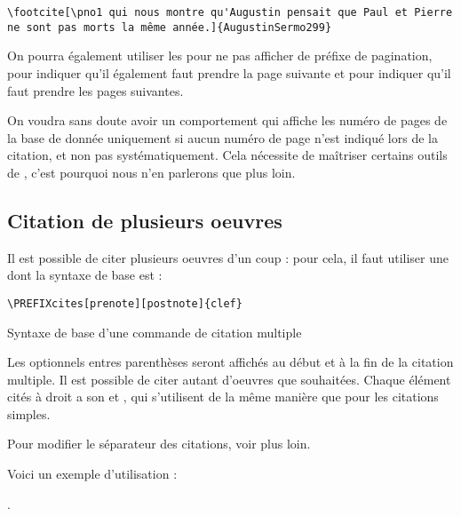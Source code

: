 \begin{verbatim}
\footcite[\pno1 qui nous montre qu'Augustin pensait que Paul et Pierre ne sont pas morts la même année.]{AugustinSermo299}
\end{verbatim}

On pourra également utiliser les   pour ne pas afficher de préfixe de pagination,   pour indiquer qu'il également faut prendre la page suivante et  pour indiquer qu'il faut prendre les pages suivantes.

\begin{anedocte}
On voudra sans doute avoir un comportement qui affiche les numéro de pages de la base de donnée uniquement si aucun numéro de page n'est indiqué lors de la citation, et non pas systématiquement. Cela nécessite de maîtriser certains outils de , c'est pourquoi nous n'en parlerons que plus loin.
\end{anedocte}

\subsection{Citation de plusieurs oeuvres}

Il est possible de citer plusieurs oeuvres d'un coup : pour cela, il faut utiliser une  dont la syntaxe de base est :

\begin{listing}[ht]
\begin{verbatim}
\PREFIXcites[prenote][postnote]{clef}
\end{verbatim}
\caption{Syntaxe de base d'une commande de citation multiple}
\end{listing}
Les  optionnels entres parenthèses seront affichés au début et à la fin de la citation multiple. Il est possible de citer autant d'oeuvres que souhaitées. Chaque élément cités à droit a son   et , qui s'utilisent de la même manière que pour les citations simples.

\begin{anedocte}
Pour modifier le séparateur des citations, voir plus loin.
\end{anedocte}

Voici un exemple d'utilisation : 

.

